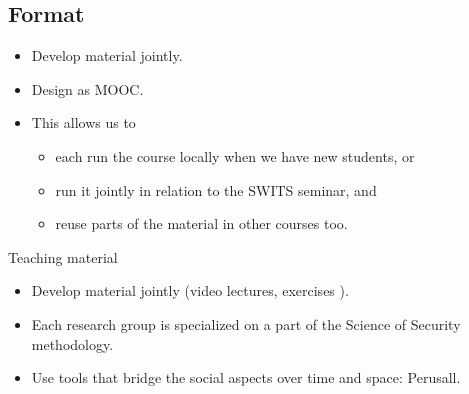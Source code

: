 \subsection{Format}

\begin{frame}
  \begin{idea}
    \begin{itemize}
      \item Develop material jointly.
      \item Design as MOOC.
      \item This allows us to
        \begin{itemize}
          \item each run the course locally when we have new students, or
          \item run it jointly in relation to the SWITS seminar, and
          \item reuse parts of the material in other courses too.
        \end{itemize}
    \end{itemize}
  \end{idea}
\end{frame}

\begin{frame}
  \begin{block}{Teaching material}
    \begin{itemize}
      \item Develop material jointly (video lectures, exercises \etc).
      \item Each research group is specialized on a part of the Science of 
        Security methodology.

      \item Use tools that bridge the social aspects over time and space:
        \eg Perusall.
    \end{itemize}
  \end{block}
\end{frame}

